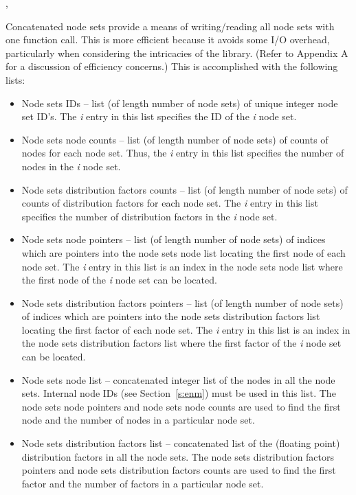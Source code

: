 \begin{spacing}{1.5}
\api {}, 
\end{spacing}

Concatenated node sets provide a means of writing/reading all node
sets with one function call. This is more efficient because it avoids
some I/O overhead, particularly when considering the intricacies of
the  library. (Refer to Appendix A for a discussion of
efficiency concerns.) This is accomplished with the following lists:

\begin{itemize}

 \item Node sets IDs -- list (of length number of node sets)
of unique integer node set ID's. The \textit{{i}}\th{} entry in
this list specifies the ID of the \textit{{i}}\th{} node set.

 \item Node sets node counts -- list (of length number of
node sets) of counts of nodes for each node set. Thus, the \textit{{i}}\th{}
entry in this list specifies the number of nodes in the \textit{{i}}\th{}
node set.

 \item Node sets distribution factors counts -- list (of
length number of node sets) of counts of distribution factors
for each node set. The \textit{{i}}\th{} entry in this list specifies
the number of distribution factors in the \textit{{i}}\th{} node
set.

 \item Node sets node pointers -- list (of length number
of node sets) of indices which are pointers into the node sets
node list locating the first node of each node set. The \textit{{i}}\th{}
entry in this list is an index in the node sets node list where
the first node of the \textit{{i}}\th{} node set can be located.

 \item Node sets distribution factors pointers -- list (of
length number of node sets) of indices which are pointers into
the node sets distribution factors list locating the first factor
of each node set. The \textit{{i}}\th{} entry in this list is an
index in the node sets distribution factors list where the first
factor of the \textit{{i}}\th{} node set can be located.

 \item Node sets node list -- concatenated integer list of the nodes
 in all the node sets. Internal node IDs (see Section~\ref{s:enm})
 must be used in this list. The node sets node pointers and node sets
 node counts are used to find the first node and the number of nodes
 in a particular node set.

 \item Node sets distribution factors list -- concatenated
list of the (floating point) distribution factors in all the
node sets. The node sets distribution factors pointers and node
sets distribution factors counts are used to find the first factor
and the number of factors in a particular node set.

\end{itemize}


